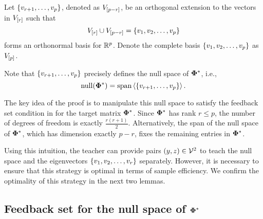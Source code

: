 
Let $\left\{v_{r+1}, \dots, v_p\right\}$, denoted as $V_{\left[p - r\right]}$, be an orthogonal extension to the vectors in $V_{\left[r\right]}$ such that
\[
    V_{\left[r\right]} \cup V_{\left[p - r\right]} = \left\{v_1, v_2, \ldots, v_p\right\}
\]
forms an orthonormal basis for $\mathbb{R}^p$. Denote the complete basis $\left\{v_1, v_2, \ldots, v_p\right\}$ as $V_{\left[p\right]}$.

Note that $\left\{v_{r+1}, \ldots, v_p\right\}$ precisely defines the null space of $\boldsymbol{\Phi}^*$, i.e.,
\[
    \mathrm{null}({\boldsymbol{\Phi}^*}) = \text{span}\left<\left\{v_{r+1}, \ldots, v_p\right\}\right>.
\]


The key idea of the proof is to manipulate this null space to satisfy the feedback set condition in  for the target matrix $\boldsymbol{\Phi}^*$. Since $\boldsymbol{\Phi}^*$ has rank $r \leq p$, the number of degrees of freedom is exactly $\frac{r(r+1)}{2}$. Alternatively, the span of the null space of $\boldsymbol{\Phi}^*$, which has dimension exactly $p - r$, fixes the remaining entries in $\boldsymbol{\Phi}^*$. 

Using this intuition, the teacher can provide pairs $(y, z) \in {\mathcal{V}}^2$ to teach the null space and the eigenvectors $\left\{v_1, v_2, \ldots, v_r\right\}$ separately. However, it is necessary to ensure that this strategy is optimal in terms of sample efficiency. We confirm the optimality of this strategy in the next two lemmas.

\subsection{Feedback set for the null space of \texorpdfstring{$\boldsymbol{\Phi}^*$}{phi*}}


